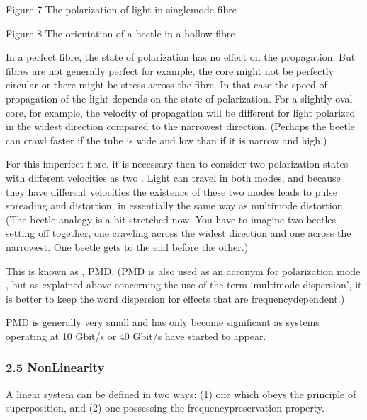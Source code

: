 \documentclass[letterpaper,10pt,english]{sphinxmanual}
\let\sphinxpxdimen\pdfpxdimen\else\newdimen\sphinxpxdimen
\begin{document}
\sphinxincludegraphics[width=511\sphinxpxdimen,height=97\sphinxpxdimen]{{t305_007i}.jpg}

Figure 7 The polarization of light in single\sphinxhyphen{}mode fibre

\sphinxincludegraphics[width=511\sphinxpxdimen,height=681\sphinxpxdimen]{{t305_008i}.gif}

Figure 8 The orientation of a beetle in a hollow fibre

In a perfect fibre, the state of polarization has no effect on the propagation. But fibres are not generally perfect \textendash{} for example, the core might not be perfectly circular or there might be stress across the fibre. In that case the speed of propagation of the light depends on the state of polarization. For a slightly oval core, for example, the velocity of propagation will be different for light polarized in the widest direction compared to the narrowest direction. (Perhaps the beetle can crawl
faster if the tube is wide and low than if it is narrow and high.)

For this imperfect fibre, it is necessary then to consider two polarization states with different velocities as two . Light can travel in both modes, and because they have different velocities the existence of these two modes leads to pulse spreading and distortion, in essentially the same way as multimode distortion. (The beetle analogy is a bit stretched now. You have to imagine two beetles setting off together, one crawling across the widest direction and one across the
narrowest. One beetle gets to the end before the other.)

This is known as , PMD. (PMD is also used as an acronym for polarization mode , but as explained above concerning the use of the term ‘multimode dispersion’, it is better to keep the word dispersion for effects that are frequency\sphinxhyphen{}dependent.)

PMD is generally very small and has only become significant as systems operating at 10 Gbit/s or 40 Gbit/s have started to appear.


\subsubsection{2.5 Non\sphinxhyphen{}Linearity}
\label{\detokenize{content/session_00/Part_00_02:2.5-Non-Linearity}}
A linear system can be defined in two ways: (1) one which obeys the principle of superposition, and (2) one possessing the frequency\sphinxhyphen{}preservation property.
\end{document}
